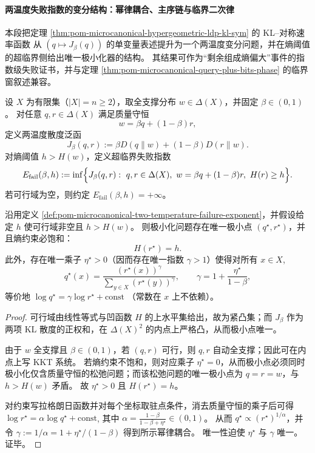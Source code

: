 
\paragraph{两温度失败指数的变分结构：幂律耦合、主序链与临界二次律}
本段把定理 \ref{thm:pom-microcanonical-hypergeometric-ldp-kl-sym} 的 KL--对称速率函数
从 \((q\mapsto J_\beta(q))\) 的单变量表述提升为一个两温度变分问题，并在熵阈值的超临界侧给出唯一极小化器的结构。
其结果可作为“剩余组成熵偏大”事件的指数级失败证书，并与定理 \ref{thm:pom-microcanonical-query-plus-bits-phase} 的临界窗叙述兼容。

\begin{definition}\label{def:pom-microcanonical-two-temperature-failure-exponent}
设 \(X\) 为有限集（\(|X|=n\ge 2\)），取全支撑分布 \(w\in\Delta(X)\)，并固定 \(\beta\in(0,1)\)。
对任意 \(q,r\in\Delta(X)\) 满足质量守恒
\[
w=\beta q+(1-\beta)r,
\]
定义两温度散度泛函
\[
J_\beta(q,r):=\beta D(q\|w)+(1-\beta)D(r\|w).
\]
对熵阈值 \(h>H(w)\)，定义超临界失败指数
\[
E_{\mathrm{fail}}(\beta,h)
:=
\inf\Bigl\{J_\beta(q,r):\ q,r\in\Delta(X),\ w=\beta q+(1-\beta)r,\ H(r)\ge h\Bigr\}.
\]
若可行域为空，则约定 \(E_{\mathrm{fail}}(\beta,h)=+\infty\)。
\end{definition}

\begin{theorem}\label{thm:pom-microcanonical-two-temperature-kkt-power-law}
沿用定义 \ref{def:pom-microcanonical-two-temperature-failure-exponent}，并假设给定 \(h\) 使可行域非空且 \(h>\!H(w)\)。
则极小化问题存在唯一极小点 \((q^\star,r^\star)\)，并且熵约束必饱和：
\[
H(r^\star)=h.
\]
此外，存在唯一乘子 \(\eta^\star>0\)（因而存在唯一指数 \(\gamma>1\)）使得对所有 \(x\in X\),
\[
q^\star(x)=\frac{(r^\star(x))^{\gamma}}{\sum_{y\in X}(r^\star(y))^{\gamma}},
\qquad
\gamma=1+\frac{\eta^\star}{1-\beta},
\]
等价地
\(
\log q^\star=\gamma\log r^\star+\mathrm{const}
\)
（常数在 \(x\) 上不依赖）。
\end{theorem}
\begin{proof}
可行域由线性等式与凹函数 \(H\) 的上水平集给出，故为紧凸集；而 \(J_\beta\) 作为两项 KL 散度的正权和，在 \(\Delta(X)^2\) 的内点上严格凸，从而极小点唯一。
\par
由于 \(w\) 全支撑且 \(\beta\in(0,1)\)，若 \((q,r)\) 可行，则 \(q,r\) 自动全支撑；因此可在内点上写 KKT 系统。
若熵约束不饱和，则对应乘子 \(\eta^\star=0\)，从而极小点必须同时极小化仅含质量守恒的松弛问题；而该松弛问题的唯一极小点为 \(q=r=w\)，与 \(h>H(w)\) 矛盾。
故 \(\eta^\star>0\) 且 \(H(r^\star)=h\)。
\par
对约束写拉格朗日函数并对每个坐标取驻点条件，消去质量守恒的乘子后可得
\(
\log r^\star=\alpha\log q^\star+\mathrm{const}
\),
其中
\(
\alpha=\frac{1-\beta}{1-\beta+\eta^\star}\in(0,1)
\)。
从而 \(q^\star\propto (r^\star)^{1/\alpha}\)，并令 \(\gamma:=1/\alpha=1+\eta^\star/(1-\beta)\) 得到所示幂律耦合。
唯一性迫使 \(\eta^\star\) 与 \(\gamma\) 唯一。证毕。
\end{proof}

